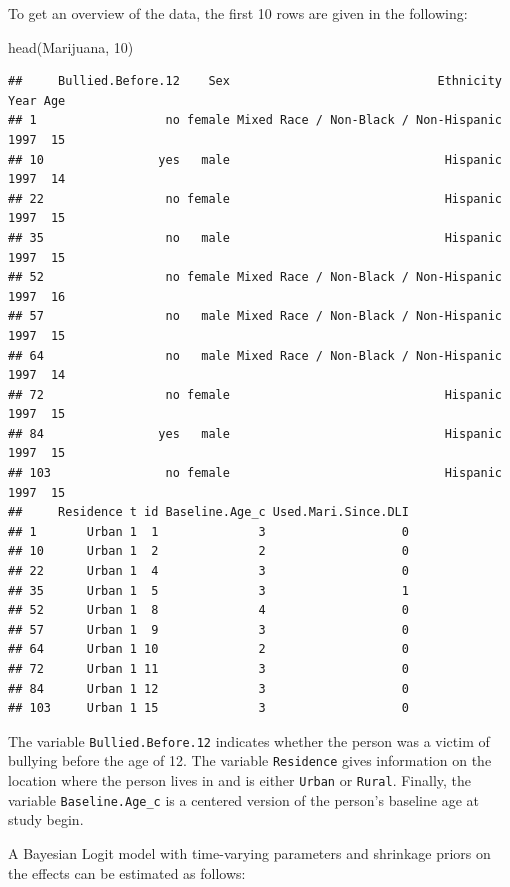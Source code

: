 \documentclass[a4paper, preprint, 3p,
authoryear]{elsarticle} %
\newenvironment{Shaded}{\begin{snugshade}}{\end{snugshade}}
\newcommand{\NormalTok}[1]{#1}
\begin{document}
To get an overview of the data, the first 10 rows are given in the
following:

\begin{Shaded}
\begin{Highlighting}[]
\NormalTok{head(Marijuana, 10)}
\end{Highlighting}
\end{Shaded}

\begin{verbatim}
##     Bullied.Before.12    Sex                             Ethnicity Year Age
## 1                  no female Mixed Race / Non-Black / Non-Hispanic 1997  15
## 10                yes   male                              Hispanic 1997  14
## 22                 no female                              Hispanic 1997  15
## 35                 no   male                              Hispanic 1997  15
## 52                 no female Mixed Race / Non-Black / Non-Hispanic 1997  16
## 57                 no   male Mixed Race / Non-Black / Non-Hispanic 1997  15
## 64                 no   male Mixed Race / Non-Black / Non-Hispanic 1997  14
## 72                 no female                              Hispanic 1997  15
## 84                yes   male                              Hispanic 1997  15
## 103                no female                              Hispanic 1997  15
##     Residence t id Baseline.Age_c Used.Mari.Since.DLI
## 1       Urban 1  1              3                   0
## 10      Urban 1  2              2                   0
## 22      Urban 1  4              3                   0
## 35      Urban 1  5              3                   1
## 52      Urban 1  8              4                   0
## 57      Urban 1  9              3                   0
## 64      Urban 1 10              2                   0
## 72      Urban 1 11              3                   0
## 84      Urban 1 12              3                   0
## 103     Urban 1 15              3                   0
\end{verbatim}

The variable \texttt{Bullied.Before.12} indicates whether the person was
a victim of bullying before the age of 12. The variable
\texttt{Residence} gives information on the location where the person
lives in and is either \texttt{Urban} or \texttt{Rural}. Finally, the
variable \texttt{Baseline.Age\_c} is a centered version of the person's
baseline age at study begin.

A Bayesian Logit model with time-varying parameters and shrinkage priors
on the effects can be estimated as follows:
\end{document}
